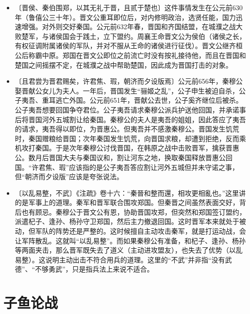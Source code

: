 \documentclass[12pt,UTF-8,openany,a4]{ctexbook}
\begin{document}
\begin{itemize}
    \setlength\itemsep{-0.2em}
    \item〔晋侯、秦伯围郑，以其无礼于晋，且贰于楚也〕{\yiwen 这件事情发生在公元前630年（鲁僖公三十年）。晋文公重耳即位后，对内修明政治，选贤任能，国力迅速增强。对外则交好秦国。公元前632年春，晋国和齐国结盟，在城濮之战大败楚军，与诸侯国会于践土，立下盟约。周襄王命晋文公为侯伯（诸侯之长，有权征调附属诸侯的军队，并对不服从王命的诸侯进行征伐）。晋文公继齐桓公后称霸中原。郑国在晋文公即位之前流亡时没有按礼接待他，而且在晋国和楚国之间摇摆不定，在城濮之战中帮助楚国，因此成为晋国打击的对象。}
    \item〔且君尝为晋君赐矣，许君焦、瑕，朝济而夕设版焉〕{\yiwen 公元前656年，秦穆公娶晋献公女儿为夫人。一年后，晋国发生“骊姬之乱”，公子申生被迫自杀，公子夷吾、重耳逃亡外国。公元前651年，晋献公去世，公子奚齐继位后被杀。公子夷吾想要回国争夺君位。公子夷吾请求秦穆公派兵护送他回国，并承诺事后将晋国河外五城割让给秦国。秦穆公的夫人是夷吾的姐姐，因此答应了夷吾的请求，夷吾得以即位，为晋惠公。但夷吾并不感激秦穆公。晋国发生饥荒时，秦国赠粮给晋国；次年秦国发生饥荒，向晋国求粮，却遭到拒绝，反而乘机攻打秦国。于是次年秦穆公讨伐晋国，在韩原之战中击败晋军，擒获晋惠公。数月后晋国大夫与秦国议和，割让河东之地，换取秦国释放晋惠公回国。“许君焦、瑕”应该指的是公子夷吾答应割让河外五城但并未守诺之事，但“朝济而夕设版”应该是夸张说法。}
    \item〔以乱易整，不武〕{\yiwen 《注疏》卷十六：“秦晉和整而還，相攻更相亂也。”这里讲的是军事上的道理。秦军和晋军联合围攻郑国。但秦晋之间虽然表面交好，背后也有顾忌。秦穆公于晋文公有恩，协助晋国攻郑，但突然和郑国签订盟约，派遣杞子、逢孙、杨孙守卫郑国，然后主力撤退回国。这时晋军本来就处于被动，但军队的阵势还是严整的。这时候擅自主动攻击秦军，就是打运动战，会让军阵散乱。这就叫“以乱易整”。而如果秦穆公有准备，和杞子、逢孙、杨孙等两面夹击，那么晋军既失去了道义（主动进攻盟友），也失去了优势（以乱易整）。这说明主动出击不符合用兵的道理。这里的“不武”并非指“没有武德”、“不够勇武”，只是指兵法上来说不适合。}
\end{itemize}

\chapter{子鱼论战}
\end{document}
